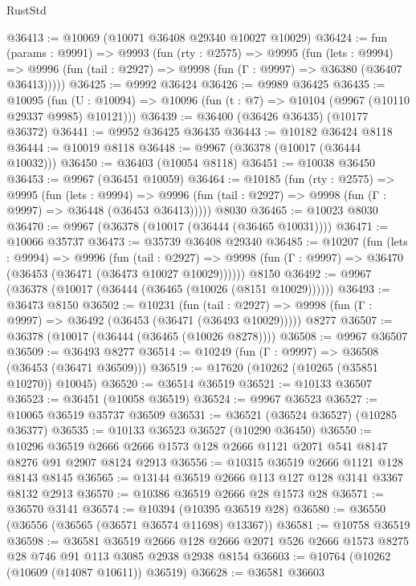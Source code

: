 \begin{lexlean}{RustStd}
\begin{coremodule}
@36413 := @10069 (@10071 @36408 @29340 @10027 @10029)
@36424 := fun (params : @9991) =>
  @9993
    (fun (rty : @2575) =>
    @9995
      (fun (lets : @9994) =>
      @9996 (fun (tail : @2927) => @9998 (fun (Γ : @9997) => @36380 (@36407 @36413)))))
@36425 := @9992 @36424
@36426 := @9989 @36425
@36435 := @10095
    (fun (U : @10094) => @10096 (fun (t : @7) => @10104 (@9967 (@10110 @29337 @9985) @10121)))
@36439 := @36400 (@36426 @36435) (@10177 @36372)
@36441 := @9952 @36425 @36435
@36443 := @10182 @36424 @8118
@36444 := @10019 @8118
@36448 := @9967 (@36378 (@10017 (@36444 @10032)))
@36450 := @36403 (@10054 @8118)
@36451 := @10038 @36450
@36453 := @9967 (@36451 @10059)
@36464 := @10185
    (fun (rty : @2575) =>
    @9995
      (fun (lets : @9994) =>
      @9996 (fun (tail : @2927) => @9998 (fun (Γ : @9997) => @36448 (@36453 @36413)))))
    @8030
@36465 := @10023 @8030
@36470 := @9967 (@36378 (@10017 (@36444 (@36465 @10031))))
@36471 := @10066 @35737
@36473 := @35739 @36408 @29340
@36485 := @10207
    (fun (lets : @9994) =>
    @9996
      (fun (tail : @2927) =>
      @9998 (fun (Γ : @9997) => @36470 (@36453 (@36471 (@36473 @10027 @10029))))))
    @8150
@36492 := @9967 (@36378 (@10017 (@36444 (@36465 (@10026 (@8151 @10029))))))
@36493 := @36473 @8150
@36502 := @10231
    (fun (tail : @2927) => @9998 (fun (Γ : @9997) => @36492 (@36453 (@36471 (@36493 @10029)))))
    @8277
@36507 := @36378 (@10017 (@36444 (@36465 (@10026 @8278))))
@36508 := @9967 @36507
@36509 := @36493 @8277
@36514 := @10249 (fun (Γ : @9997) => @36508 (@36453 (@36471 @36509)))
@36519 := @17620 (@10262 (@10265 (@35851 @10270)) @10045)
@36520 := @36514 @36519
@36521 := @10133 @36507
@36523 := @36451 (@10058 @36519)
@36524 := @9967 @36523
@36527 := @10065 @36519 @35737 @36509
@36531 := @36521 (@36524 @36527) (@10285 @36377)
@36535 := @10133 @36523 @36527 (@10290 @36450)
@36550 := @10296
    @36519
    @2666
    @2666
    @1573
    @128
    @2666
    @1121
    @2071
    @541
    @8147
    @8276
    @91
    @2907
    @8124
    @2913
@36556 := @10315 @36519 @2666 @1121 @128 @8143 @8145
@36565 := @13144 @36519 @2666 @113 @127 @128 @3141 @3367 @8132 @2913
@36570 := @10386 @36519 @2666 @28 @1573 @28
@36571 := @36570 @3141
@36574 := @10394 (@10395 @36519 @28)
@36580 := @36550 (@36556 (@36565 (@36571 @36574 @11698) @13367))
@36581 := @10758 @36519
@36598 := @36581
    @36519
    @2666
    @128
    @2666
    @2071
    @526
    @2666
    @1573
    @8275
    @28
    @746
    @91
    @113
    @3085
    @2938
    @2938
    @8154
@36603 := @10764 (@10262 (@10609 (@14087 @10611)) @36519)
@36628 := @36581
    @36603

\end{coremodule}
\end{lexlean}
